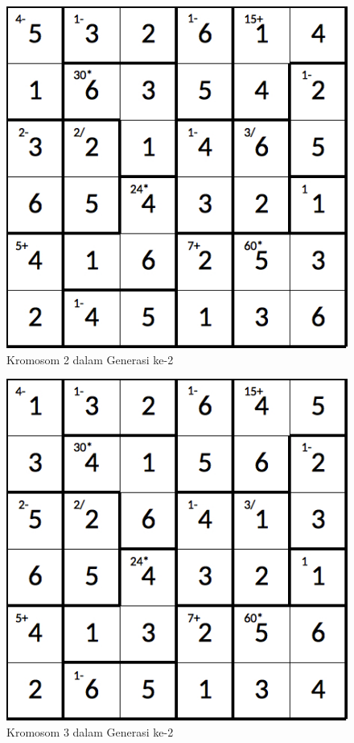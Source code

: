 \documentclass[a4paper,twoside]{article}
\begin{document}
\begin{enumerate}
\begin{figure}
\centering
\captionsetup{justification=centering}
\includegraphics[scale=0.333]{Gambar/hybridgenetic/Generation2Chromosome2}
\caption[Kromosom 2 dalam Generasi ke-2]{Kromosom 2 dalam Generasi ke-2}
\label{fig:analisisg2k2}
\end{figure}

\begin{figure}
\centering
\captionsetup{justification=centering}
\includegraphics[scale=0.333]{Gambar/hybridgenetic/Generation2Chromosome3}
\caption[Kromosom 3 dalam Generasi ke-2]{Kromosom 3 dalam Generasi ke-2}
\label{fig:analisisg2k3}
\end{figure}


\end{enumerate}
\end{document}

